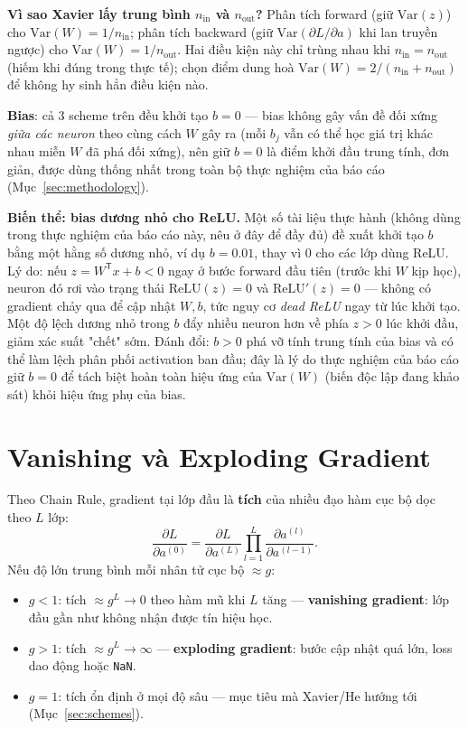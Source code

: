 \documentclass[12pt,a4paper]{report}
\newcommand{\T}{^{\mathsf{T}}}
\begin{document}
\textbf{Vì sao Xavier lấy trung bình $n_{\text{in}}$ và $n_{\text{out}}$?}
Phân tích forward (giữ $\mathrm{Var}(z)$) cho $\mathrm{Var}(W)=1/n_{\text{in}}$;
phân tích backward (giữ $\mathrm{Var}(\partial L/\partial a)$ khi lan
truyền ngược) cho $\mathrm{Var}(W)=1/n_{\text{out}}$. Hai điều kiện này chỉ
trùng nhau khi $n_{\text{in}}=n_{\text{out}}$ (hiếm khi đúng trong thực
tế); \citet{glorot2010understanding} chọn điểm dung hoà
$\mathrm{Var}(W)=2/(n_{\text{in}}+n_{\text{out}})$ để không hy sinh hẳn
điều kiện nào.

\textbf{Bias}: cả 3 scheme trên đều khởi tạo $b=0$ --- bias không gây vấn
đề đối xứng \emph{giữa các neuron} theo cùng cách $W$ gây ra (mỗi $b_j$
vẫn có thể học giá trị khác nhau miễn $W$ đã phá đối xứng), nên giữ $b=0$
là điểm khởi đầu trung tính, đơn giản, được dùng thống nhất trong toàn bộ
thực nghiệm của báo cáo (Mục~\ref{sec:methodology}).

\par\noindent\textbf{Biến thể: bias dương nhỏ cho ReLU.}\enspace 
Một số tài liệu thực hành (không dùng trong thực nghiệm của báo cáo này,
nêu ở đây để đầy đủ) đề xuất khởi tạo $b$ bằng một hằng số dương nhỏ, ví
dụ $b=0.01$, thay vì $0$ cho các lớp dùng ReLU. Lý do: nếu $z=W\T x+b<0$
ngay ở bước forward đầu tiên (trước khi $W$ kịp học), neuron đó rơi vào
trạng thái $\mathrm{ReLU}(z)=0$ và $\mathrm{ReLU}'(z)=0$ --- không có
gradient chảy qua để cập nhật $W,b$, tức nguy cơ \emph{dead ReLU} ngay từ
lúc khởi tạo. Một độ lệch dương nhỏ trong $b$ đẩy nhiều neuron hơn về phía
$z>0$ lúc khởi đầu, giảm xác suất "chết" sớm. Đánh đổi: $b>0$ phá vỡ tính
trung tính của bias và có thể làm lệch phân phối activation ban đầu; đây
là lý do thực nghiệm của báo cáo giữ $b=0$ để tách biệt hoàn toàn hiệu ứng
của $\mathrm{Var}(W)$ (biến độc lập đang khảo sát) khỏi hiệu ứng phụ của
bias.
\par

\section{Vanishing và Exploding Gradient}
\label{sec:vanishing}

Theo Chain Rule, gradient tại lớp đầu là \textbf{tích} của nhiều đạo hàm
cục bộ dọc theo $L$ lớp:
$$\frac{\partial L}{\partial a^{(0)}} = \frac{\partial L}{\partial a^{(L)}}\prod_{l=1}^{L} \frac{\partial a^{(l)}}{\partial a^{(l-1)}}.$$
Nếu độ lớn trung bình mỗi nhân tử cục bộ $\approx g$:
\begin{itemize}
\item $g<1$: tích $\approx g^L \to 0$ theo hàm mũ khi $L$ tăng ---
  \textbf{vanishing gradient}: lớp đầu gần như không nhận được tín hiệu
  học.
\item $g>1$: tích $\approx g^L \to \infty$ --- \textbf{exploding
  gradient}: bước cập nhật quá lớn, loss dao động hoặc \texttt{NaN}.
\item $g=1$: tích ổn định ở mọi độ sâu --- mục tiêu mà Xavier/He hướng
  tới (Mục~\ref{sec:schemes}).
\end{itemize}
\end{document}
